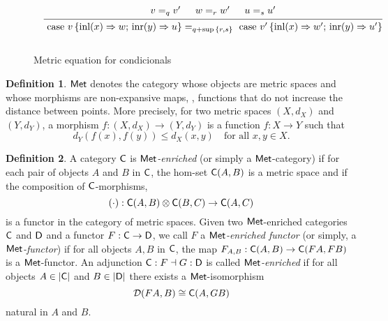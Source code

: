 \documentclass[10pt,a4paper]{amsart}
\theoremstyle{definition}
\newtheorem{definition}{Definition}[section]
\theoremstyle{definition}
\theoremstyle{definition}
\theoremstyle{definition}
\theoremstyle{definition}
\theoremstyle{definition}
\begin{document}
\begin{figure}[H]
  \begin{equation*}
  \begin{aligned}
  &
  &
  \begin{prooftree}
      \hypo{ v =_{q} v' }
      \hypo{w=_{r} w'}
      \hypo{u=_{s}u'}
      \infer3[]{\text{ case } v \,   \{\text{inl} (x) \Rightarrow w ; \, \text{inr} (y) \Rightarrow u\} =_{q+\sup{\{ r, s \}}} \text{ case } v' \,  \{\text{inl} (x) \Rightarrow w' ; \,\text{inr} (y) \Rightarrow u'\} }
  \end{prooftree}
  \\[10pt]
  \end{aligned}
  \end{equation*}
  \caption{Metric equation for condicionals}
  \label{fig:metric conditionals}
\end{figure}



\begin{definition}
    $\mathsf{Met}$ denotes the category whose objects are metric spaces and whose morphisms are non-expansive maps, \ie, functions that do not increase the distance between points. More precisely, for two metric spaces $(X, d_X)$ and $(Y, d_Y)$, a morphism $f: (X, d_X) \to (Y, d_Y)$ is a function $f: X \to Y$ such that
$$
d_Y(f(x), f(y)) \leq d_X(x, y) \quad \text{for all } x, y \in X.
$$
  \end{definition}
    


\begin{definition}
 A category $\mathsf{C}$ is $\mathsf{Met}$\emph{-enriched} (or simply a $\mathsf{Met}$-category) if for each pair of objects $A$ and $B$ in $\mathsf{C}$, the hom-set $\mathsf{C}(A, B)$ is a metric space and if the composition of $\mathsf{C}$-morphisms,
 $$(\cdot): \mathsf{C}(A, B) \otimes \mathsf{C}(B, C) \rightarrow \mathsf{C}(A, C)$$
 is a functor in the category of metric spaces. 
 Given two $\mathsf{Met}$-enriched categories $\mathsf{C}$ and $\mathsf{D}$ and a functor $F : \mathsf{C}\to \mathsf{D}$, we call 
$F$ a \emph{$\mathsf{Met}$-enriched functor} (or simply, a \emph{$\mathsf{Met}$-functor}) if for all objects $A, B$ in $\mathsf{C}$, 
the map $F_{A,B} : \mathsf{C}(A,B) \to \mathsf{C}(FA, FB)$ is a $\mathsf{Met}$-functor. 
An adjunction $\mathsf{C} : F \dashv G : \mathsf{D}$ is called \emph{$\mathsf{Met}$-enriched} if for all objects $A \in |\mathsf{C}|$ 
and $B \in |\mathsf{D}|$ there exists a $\mathsf{Met}$-isomorphism
\[
\mathcal{D}(FA, B) \cong \mathsf{C}(A, GB)
\]
natural in $A$ and $B$.
\end{definition}
\end{document}
